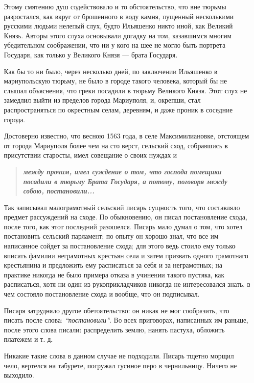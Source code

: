 \documentclass[a4paper,20pt]{report}
\begin{document}
Этому смятению душ содействовало и то обстоятельство, что вне тюрьмы
разростался, как вкруг от брошенного в воду камня, пущенный несколькими
русскими людьми нелепый слух, будто Ильяшенко никто иной, как Великий Князь.
Авторы этого слуха основывали догадку на том, казавшимся многим убедительном
соображении, что ни у кого на шее не могло быть портрета Государя, как только у
Великого Князя — брата Государя.

Как бы то ни было, через несколько дней, по заключении Ильяшенко в
мариупольскую тюрьму, не было в городе такого человека, который бы не слышал
объяснения, что греки посадили в тюрьму Великого Князя. Этот слух не замедлил
выйти из пределов города Мариуполя, и, окрепши, стал распространяться по
окрестным селам, деревням, и даже проник в соседние города.

Достоверно известно, что весною 1563 года, в селе Максимилиановке, отстоящем от
города Мариуполя более чем на сто верст, сельский сход, собравшись в
присутствии старосты, имел совещание о своих нуждах и 
\begin{quote}
\em\bfseries
между прочим, имел суждение о том, что господа помещики посадили в тюрьму Брата
Государя, а потому, поговоря между собою, постановили...
\end{quote}

Так записывал малограмотный сельский писарь сущность того, что составляло
предмет рассуждений на сходе. По обыкновению, он писал постановление схода,
после того, как этот последний разошелся. Писарь мало думал о том, что хотел
постановить сельский парламент; по опыту он хорошо знал, что все им написанное
сойдет за постановление схода; для этого ведь стоило ему только вписать фамилии
неграмотных крестьян села и затем призвать одного грамотнаго крестьянина и
предложить ему расписаться за себя и за неграмотных; на практике никогда не
было примера отказа в учинении такого пустяка, как расписаться, хотя ни один из
рукоприкладчиков никогда не интересовался знать, в чем состояло постановление
схода и вообще, что он подписывал.

Писаря затрудняло другое обетоятельство: он никак
не мог сообразить, что писать после слова: \emph{``постановили''}.
Во всех приговорах, написанных им раньше, после этого слова писали:
распределить землю, нанять пастуха, обложить платежем и т. д.

Никакие такие слова в данном случае не подходили. Писарь тщетно морщил чело,
вертелся на табурете, погружал гусиное перо в чернильницу.  Ничего не выходило.
\end{document}
